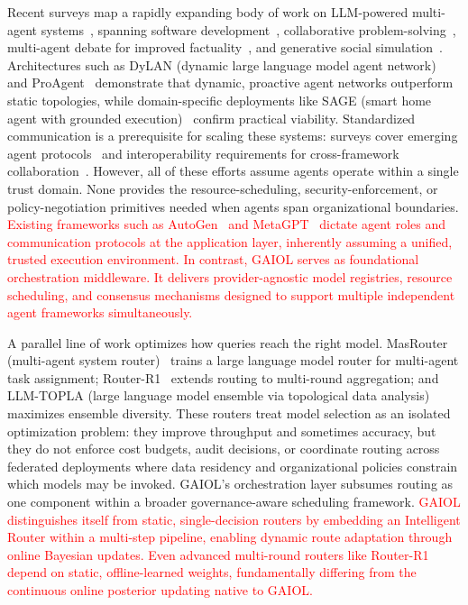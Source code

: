 \documentclass{iopjournal}
\newcommand{\rev}[1]{\textcolor{red}{#1}}
\begin{document}
Recent surveys map a rapidly expanding body of work on LLM-powered multi-agent systems~\cite{oh2015survey, dong2024large}, spanning software development~\cite{qian2024chatdev}, collaborative problem-solving~\cite{AgentVerse_EMNLP23}, multi-agent debate for improved factuality~\cite{Cooperation_NeurIPS23}, and generative social simulation~\cite{RolePlay_Nature23}. Architectures such as DyLAN (dynamic large language model agent network)~\cite{DyLAN_ICLR24} and ProAgent~\cite{ProAgent_AAAI24} demonstrate that dynamic, proactive agent networks outperform static topologies, while domain-specific deployments like SAGE (smart home agent with grounded execution)~\cite{SAGE_AAAI24} confirm practical viability. Standardized communication is a prerequisite for scaling these systems: surveys cover emerging agent protocols~\cite{AIAgentProtocols} and interoperability requirements for cross-framework collaboration~\cite{AgentInterop}. However, all of these efforts assume agents operate within a single trust domain. None provides the resource-scheduling, security-enforcement, or policy-negotiation primitives needed when agents span organizational boundaries. \rev{Existing frameworks such as AutoGen~\cite{AutoGen} and MetaGPT~\cite{MetaGPT} dictate agent roles and communication protocols at the application layer, inherently assuming a unified, trusted execution environment. In contrast, GAIOL serves as foundational orchestration middleware. It delivers provider-agnostic model registries, resource scheduling, and consensus mechanisms designed to support multiple independent agent frameworks simultaneously.}

A parallel line of work optimizes how queries reach the right model. MasRouter (multi-agent system router)~\cite{MasRouter} trains a large language model router for multi-agent task assignment; Router-R1~\cite{RouterR1} extends routing to multi-round aggregation; and LLM-TOPLA (large language model ensemble via topological data analysis)~\cite{LLMTOPLA} maximizes ensemble diversity. These routers treat model selection as an isolated optimization problem: they improve throughput and sometimes accuracy, but they do not enforce cost budgets, audit decisions, or coordinate routing across federated deployments where data residency and organizational policies constrain which models may be invoked. GAIOL's orchestration layer subsumes routing as one component within a broader governance-aware scheduling framework. \rev{GAIOL distinguishes itself from static, single-decision routers by embedding an Intelligent Router within a multi-step pipeline, enabling dynamic route adaptation through online Bayesian updates. Even advanced multi-round routers like Router-R1~\cite{RouterR1} depend on static, offline-learned weights, fundamentally differing from the continuous online posterior updating native to GAIOL.}
\end{document}
